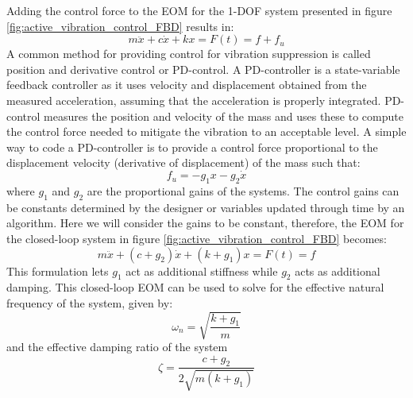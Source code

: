 \documentclass[12pt,letter]{article}
\begin{document}
Adding the control force to the EOM for the 1-DOF system presented in figure \ref{fig:active_vibration_control_FBD} results in:
\begin{equation}
m \ddot{x} + c \dot{x} + kx = F(t) = f + f_u
\end{equation}
A common method for providing control for vibration suppression is called position and derivative control or PD-control. A PD-controller is a state-variable feedback controller as it uses velocity and displacement obtained from the measured acceleration, assuming that the acceleration is properly integrated. PD-control measures the position and velocity of the mass and uses these to compute the control force needed to mitigate the vibration to an acceptable level. A simple way to code a PD-controller is to provide a control force proportional to the displacement velocity (derivative of displacement) of the mass such that:
\begin{equation}
f_u = -g_1x - g_2 \dot{x}
\end{equation}
where $g_1$ and $g_2$ are the proportional gains of the systems. The control gains can be constants determined by the designer or variables updated through time by an algorithm. Here we will consider the gains to be constant, therefore, the EOM for the closed-loop system in figure \ref{fig:active_vibration_control_FBD} becomes:
\begin{equation}
m \ddot{x} + (c + g_2) \dot{x} + (k + g_1)x = F(t) = f 
\end{equation}
This formulation lets $g_1$ act as additional stiffness while $g_2$ acts as additional damping. This closed-loop EOM can be used to solve for the effective natural frequency of the system, given by:
\begin{equation}
\omega_n = \sqrt{\frac{k+g_1}{m}}
\end{equation}
and the effective damping ratio of the system
\begin{equation}
\zeta = \frac{c+g_2}{2\sqrt{m(k+g_1)}}
\end{equation}


\pagebreak
\end{document}
